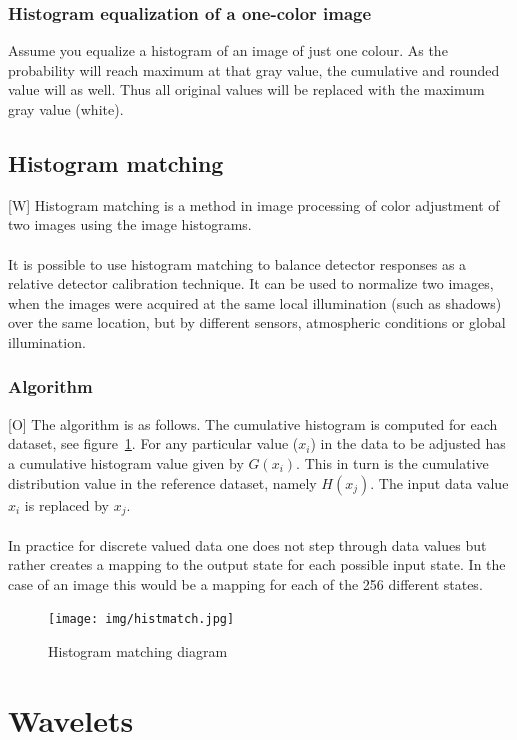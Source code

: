 \documentclass[12pt]{article}
\begin{document}
	\subsubsection{Histogram equalization of a one-color image}
	Assume you equalize a histogram of an image of just one colour. As the probability will reach maximum
	at that gray value, the cumulative and rounded value will as well. Thus all original values will be 
	replaced with the maximum gray value (white).
	\subsection{Histogram matching}
	[W] Histogram matching is a method in image processing of color adjustment of two images using 
	the image histograms.\\
	\\
	It is possible to use histogram matching to balance detector responses as a relative detector 
	calibration technique. It can be used to normalize two images, when the images were acquired at 
	the same local illumination (such as shadows) over the same location, but by different sensors, 
	atmospheric conditions or global illumination.\\
	
	\subsubsection{Algorithm}
	[O] The algorithm is as follows. The cumulative histogram is computed for each dataset, see 
	figure~\ref{fig:histogram_matching}. For any particular value ($x_i$) in the data to be adjusted 
	has a cumulative histogram value given 
	by $G(x_i)$. This in turn is the cumulative distribution value in the reference dataset, namely $H(x_j)$. 
	The input data value $x_i$ is replaced by $x_j$. \\
    \\
    In practice for discrete valued data one does not step through data values but rather creates a 
    mapping to the output state for each possible input state. In the case of an image this would be a 
    mapping for each of the 256 different states. 
	\begin{figure}[h!]
		\centering
		\texttt{[image: img/histmatch.jpg]}
		\caption{Histogram matching diagram}		
		\label{fig:histogram_matching}
	\end{figure}
%	
%	
\section{Wavelets}
\end{document}
